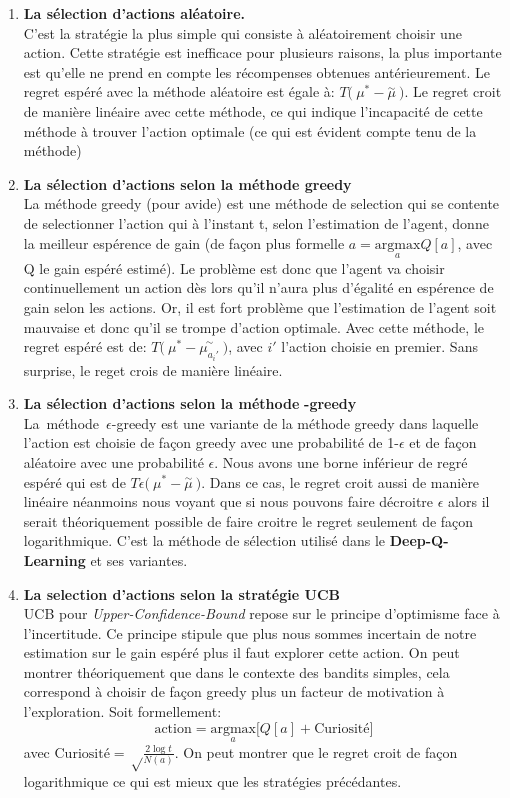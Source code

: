\begin{enumerate}
\item \textbf{La sélection d'actions aléatoire.}\\
C'est la stratégie la plus simple qui consiste à aléatoirement choisir une action. Cette stratégie est inefficace pour plusieurs raisons, la plus importante est qu'elle ne prend en compte les récompenses obtenues antérieurement.
Le regret espéré avec la méthode aléatoire est égale à: $T \big(\:\mu^* - \overset{\sim}{\mu}\: \big)$. Le regret croit de manière linéaire avec cette méthode, ce qui indique l'incapacité de cette méthode à trouver l'action optimale (ce qui est évident compte tenu de la méthode)
\item \textbf{La sélection d'actions selon la méthode greedy}\\
    La méthode greedy (pour avide) est une méthode de selection qui se contente de selectionner l'action qui à l'instant t, selon l'estimation de l'agent, donne la meilleur espérence de gain (de façon plus formelle $ a = \underset{a}{\text{argmax}} Q[a]$, avec Q le gain espéré estimé). Le problème est donc que l'agent va choisir continuellement un action dès lors qu'il n'aura plus d'égalité en espérence de gain selon les actions. Or, il est fort problème que l'estimation de l'agent soit mauvaise et donc qu'il se trompe d'action optimale. Avec cette méthode, le regret espéré est de: $T \big(\:\mu^* - \overset{\sim}{\mu_{a_i'}}\: \big)$, avec $i'$ l'action choisie en premier. Sans surprise, le reget crois de manière linéaire.
\item \textbf{La sélection d'actions selon la méthode} \bm{\epsilon} \textbf{-greedy} \\
    La\ méthode\ $\epsilon$-greedy est une variante de la méthode greedy dans laquelle l'action est choisie de façon greedy avec une probabilité de 1-$\epsilon$ et de façon aléatoire avec une probabilité $\epsilon$. Nous avons une borne inférieur de regré espéré qui est de $T \epsilon \big(\:\mu^* - \overset{\sim}{\mu}\: \big)$. Dans ce cas, le regret croit aussi de manière linéaire néanmoins nous voyant que si nous pouvons faire décroitre $\epsilon$ alors il serait théoriquement possible de faire croitre le regret seulement de façon logarithmique. C'est la méthode de sélection utilisé dans le \textbf{Deep-Q-Learning} et ses variantes. 

\item \textbf{La selection d'actions selon la stratégie UCB} \\
    \gls{UCB} pour \emph{Upper-Confidence-Bound} repose sur le principe d'optimisme face à l'incertitude. Ce principe stipule que plus nous sommes incertain de notre estimation sur le gain espéré plus il faut explorer cette action. On peut montrer théoriquement que dans le contexte des bandits simples, cela correspond à choisir de façon greedy plus un facteur de motivation à l'exploration. Soit formellement: 
    $$ \text{action} = \underset{a}{\text{argmax}}\bigg[Q[a] + \text{Curiosité}\bigg]  $$
    avec $\text{Curiosité} = \sqrt\frac{2\log t}{N(a)}$. On peut montrer que le regret croit de façon logarithmique ce qui est mieux que les stratégies précédantes.
\end{enumerate}


